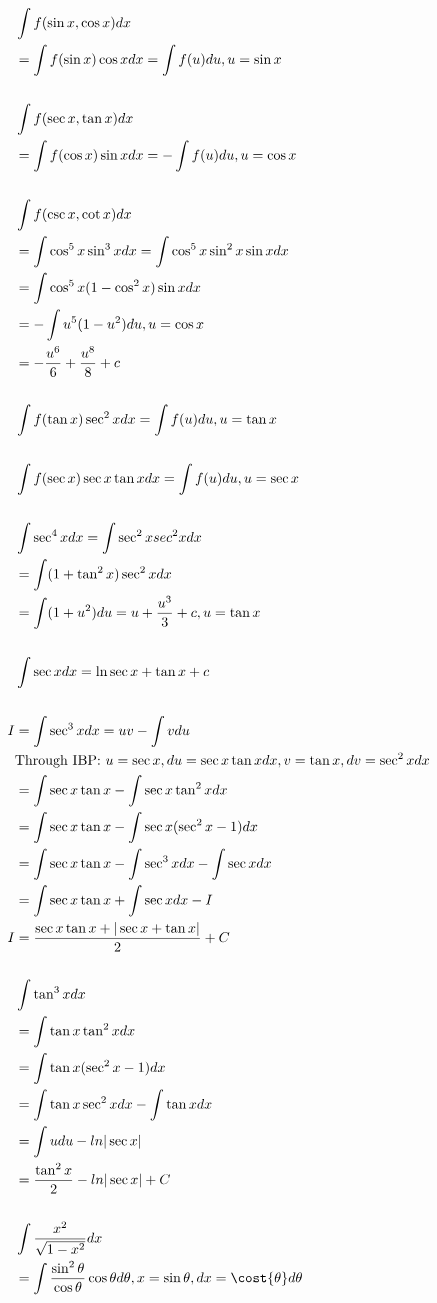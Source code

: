 \documentclass{article}
\begin{document}
\begin{align*}
    &\int f(\sin{x}, \cos{x}) dx \\
    &=\int f(\sin{x})\cos{x} dx = \int f(u) du, u = \sin{x} \\\\
    &\int f(\sec{x}, \tan{x}) dx \\
    &= \int f(\cos{x})\sin{x} dx = -\int f(u) du, u = \cos{x} \\\\ 
    &\int f(\csc{x}, \cot{x}) dx \\
    &= \int \cos^5{x}\sin^3{x}dx = \int \cos^5{x}\sin^2{x}\sin{x}dx \\
    &= \int \cos^5{x}(1-\cos^2{x})\sin{x} dx \\
    &= -\int u^5(1-u^2) du, u = \cos{x} \\
    &= -\frac{u^6}{6} + \frac{u^8}{8} + c \\\\
    &\int f(\tan{x})\sec^2{x} dx = \int f(u) du, u = \tan{x} \\\\
    &\int f(\sec{x})\sec{x}\tan{x} dx = \int f(u)du, u = \sec{x} \\\\
    &\int \sec^4{x}dx = \int \sec^2{x}sec^2{x} dx \\
    &= \int (1+\tan^2{x}) \sec^2{x} dx \\
    &= \int (1+u^2)du = u+ \frac{u^3}{3} + c, u = \tan{x} \\\\
    &\int \sec{x} dx = \ln{\sec{x}+\tan{x}} + c \\\\
    I &= \int \sec^3{x} dx = uv - \int v du \\
    &\text{Through IBP: } u=\sec{x}, du=\sec{x}\tan{x}dx, v = \tan{x}, dv = \sec^2{x}dx \\
    &= \int \sec{x}\tan{x} - \int\sec{x}\tan^2{x} dx \\
    &= \int \sec{x}\tan{x} - \int\sec{x}(\sec^2{x}-1) dx \\
    &= \int \sec{x}\tan{x} - \int\sec^3{x} dx - \int \sec{x} dx \\
    &= \int \sec{x}\tan{x} + \int\sec{x}dx - I \\
    I &= \frac{\sec{x}\tan{x}+|\sec{x}+\tan{x}|}{2} + C\\\\
    &\int\tan^3{x} dx \\
    &= \int\tan{x}\tan^2{x} dx \\
    &= \int\tan{x}(\sec^2{x}-1) dx \\
    &= \int\tan{x}\sec^2{x} dx - \int\tan{x} dx \\
    &= \int u du - ln|\sec{x}| \\
    &= \frac{\tan^2{x}}{2} - ln|\sec{x}| + C \\\\
    &\int \frac{x^2}{\sqrt{1-x^2}} dx \\
    &=\int \frac{\sin^2{\theta}}{\cos{\theta}}\cos{\theta} d\theta, x= \sin{\theta}, dx = \cost{\theta} d\theta
\end{align*}
\end{document}
